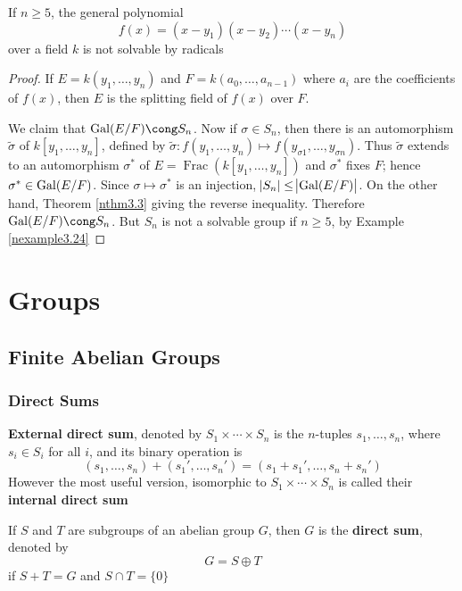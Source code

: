 \documentclass[11pt]{article}
\DeclareMathOperator{\Frac}{Frac}
\begin{document}
\begin{theorem}
If \(n\ge5\), the general polynomial
\begin{equation*}
f(x)=(x-y_1)(x-y_2)\cdots(x-y_n)
\end{equation*}
over a field \(k\) is not solvable by radicals
\end{theorem}
\begin{proof}
If \(E=k(y_1,\dots,y_n)\) and \(F=k(a_0,\dots,a_{n-1})\) where \(a_i\) are
the coefficients of \(f(x)\), then \(E\) is the splitting field of \(f(x)\)
over \(F\).

We claim that \(\Gal(E/F)\cong S_n\). Now if \(\sigma\in S_n\), then there
is an automorphism \(\widetilde{\sigma}\) of \(k[y_1,\dots,y_n]\), defined by 
\(\widetilde{\sigma}:f(y_1,\dots,y_n)\mapsto f(y_{\sigma 1},\dots,y_{\sigma n})\). Thus
\(\widetilde{\sigma}\) extends to an automorphism \(\sigma^*\) of 
\(E=\Frac(k[y_1,\dots,y_n])\) and \(\sigma^*\) fixes \(F\); hence
\(\sigma^*\in\operatorname{Gal}(E/F)\). Since \(\sigma\mapsto\sigma^*\) is an injection, 
\(\abs{S_n}\le\abs{\operatorname{Gal}(E/F)}\). 
On the other hand, Theorem \ref{nthm3.3} giving the reverse inequality.
Therefore \(\Gal(E/F)\cong S_n\). But \(S_n\) is not a solvable group if
\(n\ge5\), by Example \ref{nexample3.24}
\end{proof}




\section{Groups }
\label{sec:orgc22d514}
\subsection{Finite Abelian Groups}
\label{sec:orgda3cfdc}
\subsubsection{Direct Sums}
\label{sec:org1203c77}
\textbf{External direct sum}, denoted by \(S_1\times\cdots\times S_n\) is the
\(n\)-tuples \(s_1,\dots,s_n\), where \(s_i\in S_i\) for all \(i\), and its
binary operation is 
\begin{equation*}
(s_1,\dots,s_n)+(s_1',\dots,s_n')=(s_1+s_1',\dots,s_n+s_n')
\end{equation*}
However the most useful version, isomorphic to \(S_1\times\cdots\times S_n\)
is called their \textbf{internal direct sum}

\begin{definition}[]
If \(S\) and \(T\) are subgroups of an abelian group \(G\), then \(G\) is the
\textbf{direct sum}, denoted by
\begin{equation*}
G=S\oplus T
\end{equation*}
if \(S+T=G\) and \(S\cap T=\{0\}\)
\end{definition}
\end{document}
